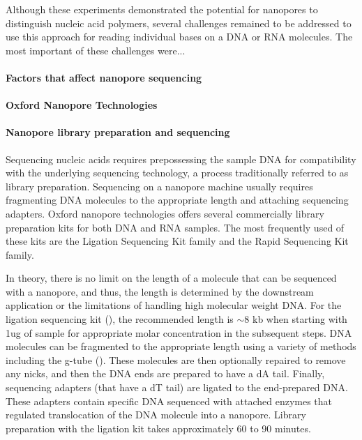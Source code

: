 Although these experiments demonstrated the potential for nanopores to
distinguish nucleic acid polymers, several challenges remained to be
addressed to use this approach for reading individual bases on a DNA or
RNA molecules.
%
The most important of these challenges were...


\paragraph{Factors that affect nanopore sequencing}

\paragraph{Oxford Nanopore Technologies}






\paragraph{Nanopore library preparation and sequencing}
Sequencing nucleic acids requires prepossessing the sample DNA for
compatibility with the underlying sequencing technology, a process
traditionally referred to as library preparation.
%
Sequencing on a nanopore machine usually requires fragmenting DNA
molecules to the appropriate length and attaching sequencing adapters.
%
Oxford nanopore technologies offers several commercially library
preparation kits for both DNA and RNA samples.  The most frequently used
of these kits are the Ligation Sequencing Kit family and the Rapid
Sequencing Kit family.

In theory, there is no limit on the length of a molecule that can be
sequenced with a nanopore, and thus, the length is determined by the
downstream application or the limitations of handling high molecular
weight DNA. For the ligation sequencing kit (), the recommended length is
$\sim$8 kb when starting with 1ug of sample for appropriate molar
concentration in the subsequent steps.  DNA molecules can be fragmented
to the appropriate length using a variety of methods including the g-tube
(). %
These molecules are then optionally repaired to remove any nicks, and
then the DNA ends are prepared to have a dA tail. Finally, sequencing
adapters (that have a dT tail) are ligated to the end-prepared DNA.
These adapters contain specific DNA sequenced with attached enzymes
that regulated translocation of the DNA molecule into a nanopore.
Library preparation with the ligation kit takes approximately 60 to
90 minutes.

